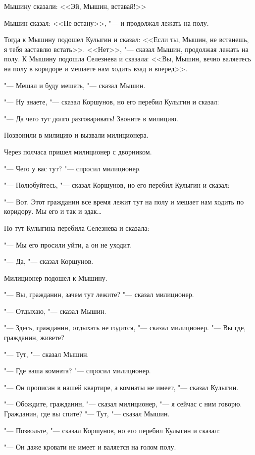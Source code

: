     Мышину сказали: <<Эй, Мышин, вставай!>> 
    
    Мышин сказал: <<Не встану>>, "--- и продолжал 
лежать на полу.

    Тогда к Мышину подошел Кулыгин и сказал:
    <<Если ты, Мышин, не встанешь, я тебя заставлю встать>>. <<Нет>>,  "--- сказал Мышин, продолжая лежать на полу. К Мышину подошла  Селезнева и сказала: <<Вы, Мышин,  вечно валяетесь на полу в коридоре и мешаете нам ходить
взад и вперед>>.

"--- Мешал и буду мешать, "--- сказал Мышин.

"--- Ну знаете,  "---  сказал Коршунов, но его
перебил Кулыгин и сказал:

"--- Да чего тут  долго разговаривать! Звоните в милицию.

    Позвонили в милицию и вызвали милиционера.
    
    Через  полчаса пришел милиционер с дворником.
    
"--- Чего у вас тут? "--- спросил милиционер.

"--- Полюбуйтесь, "--- сказал Коршунов, но его
перебил Кулыгин и сказал:

"--- Вот.  Этот  гражданин  все время лежит
тут на полу и мешает нам ходить по коридору.
Мы его и так и эдак\dots

    Но  тут Кулыгина  перебила  Селезнева  и
сказала:

"--- Мы его просили уйти, а он не уходит.


"--- Да, "--- сказал Коршунов.

    Милиционер подошел к Мышину.
    
"--- Вы,  гражданин,  зачем  тут лежите?  "---
сказал милиционер.

"--- Отдыхаю, "--- сказал Мышин.

"--- Здесь, гражданин, отдыхать не годится,
"---  сказал милиционер.  "---  Вы где, гражданин,
живете?

"--- Тут, "--- сказал Мышин.

"--- Где ваша комната?  "---  спросил милиционер.

"--- Он прописан в нашей квартире, а комнаты не имеет, "--- сказал Кулыгин.

"--- Обождите, гражданин, "--- сказал милиционер, "--- я сейчас с ним говорю. Гражданин, где
вы спите?
"--- Тут, "--- сказал Мышин.

"--- Позвольте, "--- сказал Коршунов,  но  его
перебил Кулыгин и сказал:

"--- Он даже кровати не имеет и валяется на
голом полу.

